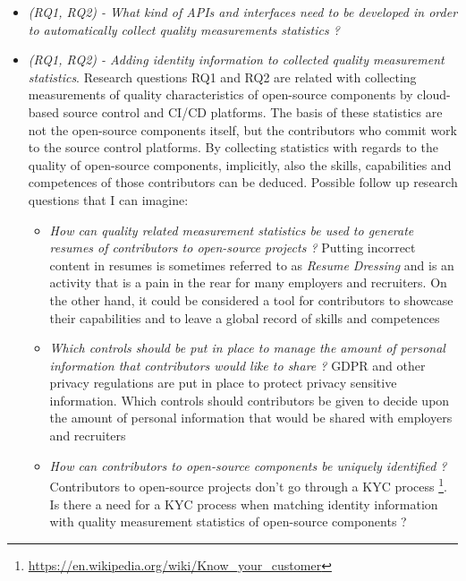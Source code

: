 \documentclass[a4paper, 10pt, conference]{ieeeconf}
\begin{document}
\begin{itemize}
    \item \textit{(RQ1, RQ2) - What kind of APIs and interfaces need to be developed in order to automatically collect quality measurements statistics ?}
    \item \textit{(RQ1, RQ2) - Adding identity information to collected quality measurement statistics}. Research questions RQ1 and RQ2 are related with collecting measurements of quality characteristics of open-source components by cloud-based source control and CI/CD platforms. The basis of these statistics are not the open-source components itself, but the contributors who commit work to the source control platforms. By collecting statistics with regards to the quality of open-source components, implicitly, also the skills, capabilities and competences of those contributors can be deduced. Possible follow up research questions that I can imagine:
    \begin{itemize}
        \item \textit{How can quality related measurement statistics be used to generate resumes of contributors to open-source projects ?} Putting incorrect content in resumes is sometimes referred to as \textit{Resume Dressing} and is an activity that is a pain in the rear for many employers and recruiters. On the other hand, it could be considered a tool for contributors to showcase their capabilities and to leave a global record of skills and competences
        \item \textit{Which controls should be put in place to manage the amount of personal information that contributors would like to share ?} GDPR and other privacy regulations are put in place to protect privacy sensitive information. Which controls should contributors be given to decide upon the amount of personal information that would be shared with employers and recruiters
        \item \textit{How can contributors to open-source components be uniquely identified ?} Contributors to open-source projects don't go through a KYC process \footnote{\url{https://en.wikipedia.org/wiki/Know_your_customer}}. Is there a need for a KYC process when matching identity information with quality measurement statistics of open-source components ?
    \end{itemize}
\end{itemize}



\end{document}
